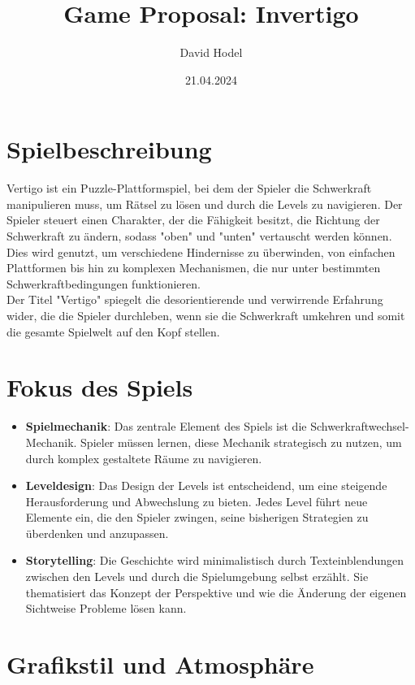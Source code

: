 \documentclass{article}
\title{Game Proposal: Invertigo}
\author{David Hodel}
\date{21.04.2024}
\begin{document}
\maketitle
\newpage

\section{Spielbeschreibung}
Vertigo ist ein Puzzle-Plattformspiel, bei dem der Spieler die Schwerkraft manipulieren muss,
um Rätsel zu lösen und durch die Levels zu navigieren. Der Spieler steuert einen Charakter,
der die Fähigkeit besitzt, die Richtung der Schwerkraft zu ändern, sodass "oben" und "unten" vertauscht werden können.
Dies wird genutzt, um verschiedene Hindernisse zu überwinden, von einfachen Plattformen bis hin zu komplexen Mechanismen,
die nur unter bestimmten Schwerkraftbedingungen funktionieren.
\\
Der Titel "Vertigo" spiegelt die desorientierende und verwirrende Erfahrung wider, die die Spieler durchleben,
wenn sie die Schwerkraft umkehren und somit die gesamte Spielwelt auf den Kopf stellen.

\section{Fokus des Spiels}

\begin{itemize}
    \item \textbf{Spielmechanik}: Das zentrale Element des Spiels ist die Schwerkraftwechsel-Mechanik.
    Spieler müssen lernen, diese Mechanik strategisch zu nutzen, um durch komplex gestaltete Räume zu navigieren.
    \item \textbf{Leveldesign}: Das Design der Levels ist entscheidend, um eine steigende Herausforderung und Abwechslung zu bieten.
    Jedes Level führt neue Elemente ein, die den Spieler zwingen, seine bisherigen Strategien zu überdenken und anzupassen.
    \item \textbf{Storytelling}: Die Geschichte wird minimalistisch durch Texteinblendungen zwischen den Levels und durch die Spielumgebung selbst erzählt.
    Sie thematisiert das Konzept der Perspektive und wie die Änderung der eigenen Sichtweise Probleme lösen kann.
\end{itemize}

\section{Grafikstil und Atmosphäre}
\end{document}
